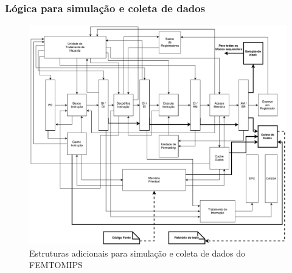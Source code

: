 \documentclass[11pt,a4paper]{article}
\begin{document}
\subsubsection{Lógica para simulação e coleta de dados}
	
	\begin{figure}[!ht]
  	\centering	
    \includegraphics[scale=0.50, angle=270]{FEMTOMIPS_GLOBAL_MODELO}
    \caption{Estruturas adicionais para simulação e coleta de dados do FEMTOMIPS}
	\end{figure}
\end{document}
